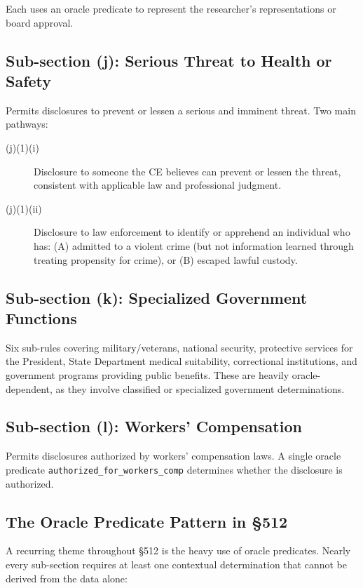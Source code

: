 \documentclass[11pt,letterpaper]{article}
\begin{document}
Each uses an oracle predicate to represent the researcher's representations or board approval.

\subsection{Sub-section (j): Serious Threat to Health or Safety}

Permits disclosures to prevent or lessen a serious and imminent threat. Two main pathways:

\begin{description}
  \item[(j)(1)(i)] Disclosure to someone the CE believes can prevent or lessen the threat, consistent with applicable law and professional judgment.
  \item[(j)(1)(ii)] Disclosure to law enforcement to identify or apprehend an individual who has: (A) admitted to a violent crime (but not information learned through treating propensity for crime), or (B) escaped lawful custody.
\end{description}

\subsection{Sub-section (k): Specialized Government Functions}

Six sub-rules covering military/veterans, national security, protective services for the President, State Department medical suitability, correctional institutions, and government programs providing public benefits. These are heavily oracle-dependent, as they involve classified or specialized government determinations.

\subsection{Sub-section (l): Workers' Compensation}

Permits disclosures authorized by workers' compensation laws. A single oracle predicate \texttt{authorized\_for\_workers\_comp} determines whether the disclosure is authorized.

\subsection{The Oracle Predicate Pattern in \S 512}

A recurring theme throughout \S 512 is the heavy use of oracle predicates. Nearly every sub-section requires at least one contextual determination that cannot be derived from the data alone:
\end{document}
